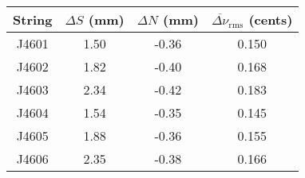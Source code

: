 \begin{tabular}{cccc}
\toprule
String & $\Delta S$ (mm) & $\Delta N$ (mm) & $\overline{\Delta \nu}_\text{rms}$ (cents) \\
\midrule
J4601 & 1.50 & -0.36 & 0.150 \\
J4602 & 1.82 & -0.40 & 0.168 \\
J4603 & 2.34 & -0.42 & 0.183 \\
J4604 & 1.54 & -0.35 & 0.145 \\
J4605 & 1.88 & -0.36 & 0.155 \\
J4606 & 2.35 & -0.38 & 0.166 \\
\bottomrule
\end{tabular}

